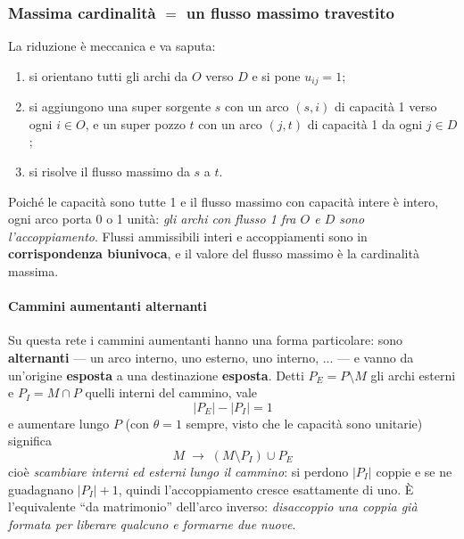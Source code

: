\documentclass[12pt]{extarticle} %
\begin{document}
\subsubsection{Massima cardinalità $=$ un flusso massimo travestito}
La riduzione è meccanica e va saputa:
\begin{enumerate}
    \item si orientano tutti gli archi da $O$ verso $D$ e si pone $u_{ij} = 1$;
    \item si aggiungono una super sorgente $s$ con un arco $(s,i)$ di capacità 1 verso ogni $i \in O$, e un super pozzo $t$ con un arco $(j,t)$ di capacità 1 da ogni $j \in D$;
    \item si risolve il flusso massimo da $s$ a $t$.
\end{enumerate}
\begin{center}
\end{center}
Poiché le capacità sono tutte 1 e il flusso massimo con capacità intere è intero, ogni arco porta 0 o 1 unità: \emph{gli archi con flusso 1 fra $O$ e $D$ sono l'accoppiamento}. Flussi ammissibili interi e accoppiamenti sono in \textbf{corrispondenza biunivoca}, e il valore del flusso massimo è la cardinalità massima.

\paragraph{Cammini aumentanti alternanti}
Su questa rete i cammini aumentanti hanno una forma particolare: sono \textbf{alternanti} --- un arco interno, uno esterno, uno interno, ... --- e vanno da un'origine \textbf{esposta} a una destinazione \textbf{esposta}. Detti $P_E = P \setminus M$ gli archi esterni e $P_I = M \cap P$ quelli interni del cammino, vale
\[
|P_E| - |P_I| = 1
\]
e aumentare lungo $P$ (con $\theta = 1$ sempre, visto che le capacità sono unitarie) significa
\[
M \;\longrightarrow\; (M \setminus P_I) \cup P_E
\]
cioè \emph{scambiare interni ed esterni lungo il cammino}: si perdono $|P_I|$ coppie e se ne guadagnano $|P_I|+1$, quindi l'accoppiamento cresce esattamente di uno. È l'equivalente ``da matrimonio'' dell'arco inverso: \emph{disaccoppio una coppia già formata per liberare qualcuno e formarne due nuove}.
\end{document}
